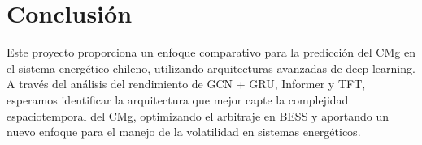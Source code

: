 \documentclass[twocolumn]{article}
\begin{document}
\section{Conclusión}
Este proyecto proporciona un enfoque comparativo para la predicción del CMg en el sistema energético chileno, utilizando arquitecturas avanzadas de deep learning. A través del análisis del rendimiento de GCN + GRU, Informer y TFT, esperamos identificar la arquitectura que mejor capte la complejidad espaciotemporal del CMg, optimizando el arbitraje en BESS y aportando un nuevo enfoque para el manejo de la volatilidad en sistemas energéticos.
\end{document}
